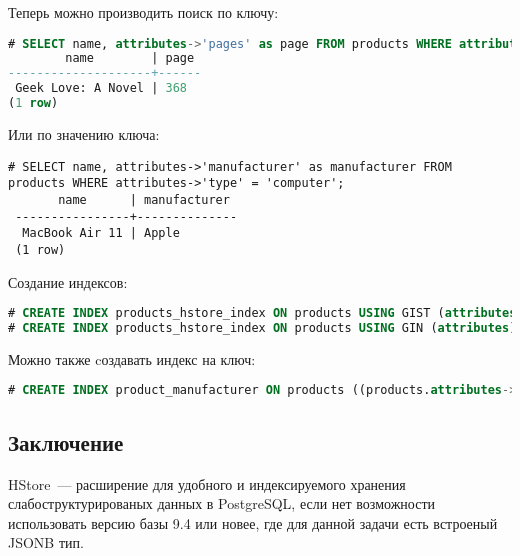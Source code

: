 Теперь можно производить поиск по ключу:

\begin{lstlisting}[language=SQL,label=lst:hstore4,caption=Поиск по ключу]
# SELECT name, attributes->'pages' as page FROM products WHERE attributes ? 'pages';
        name        | page
--------------------+------
 Geek Love: A Novel | 368
(1 row)
\end{lstlisting}

Или по значению ключа:

\begin{lstlisting}[label=lst:hstore5,caption=Поиск по значению ключа]
# SELECT name, attributes->'manufacturer' as manufacturer FROM products WHERE attributes->'type' = 'computer';
       name      | manufacturer
 ----------------+--------------
  MacBook Air 11 | Apple
 (1 row)
\end{lstlisting}

Создание индексов:

\begin{lstlisting}[language=SQL,label=lst:hstore6,caption=Индексы]
# CREATE INDEX products_hstore_index ON products USING GIST (attributes);
# CREATE INDEX products_hstore_index ON products USING GIN (attributes);
\end{lstlisting}

Можно также cоздавать индекс на ключ:

\begin{lstlisting}[language=SQL,label=lst:hstore7,caption=Индекс на ключ]
# CREATE INDEX product_manufacturer ON products ((products.attributes->'manufacturer'));
\end{lstlisting}

\subsection{Заключение}

HStore~--- расширение для удобного и индексируемого хранения слабоструктурированых данных в PostgreSQL, если нет возможности использовать версию базы 9.4 или новее, где для данной задачи есть встроеный JSONB тип.
